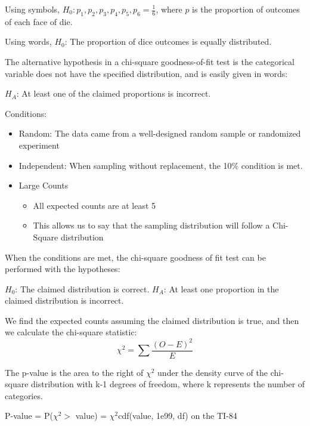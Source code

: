 \documentclass[../stats.tex]{subfiles}
\begin{document}
Using symbols, $H_0: p_1,p_2,p_3,p_4,p_5,p_6 = \frac{1}{6}$, where $p$ is the proportion of outcomes of each face of die.

Using words, $H_0$: The proportion of dice outcomes is equally distributed.

The alternative hypothesis in a chi-square goodness-of-fit test is the categorical variable does not have the specified distribution, and is easily given in words: 

$H_A$: At least one of the claimed proportions is incorrect.

Conditions:
\begin{itemize}
    \item Random: The data came from a well-designed random sample or randomized experiment 
    \item Independent: When sampling without replacement, the 10\% condition is met.
    \item Large Counts
    \begin{itemize}
        \item All expected counts are at least 5
        \item This allows us to say that the sampling distribution will follow a Chi-Square distribution 
    \end{itemize}
\end{itemize}

When the conditions are met, the chi-square goodness of fit test can be performed with the hypotheses:
\begin{center}
    $H_0$: The claimed distribution is correct.
    $H_A$: At least one proportion in the claimed distribution is incorrect.
\end{center}

We find the expected counts assuming the claimed distribution is true, and then we calculate the chi-square statistic:
\[ \chi^2 = \sum \frac{(O-E)^2}{E} \]

The p-value is the area to the right of $\chi^2$ under the density curve of the chi-square distribution with k-1 degrees of freedom, where k represents the number of categories.
\begin{center}
    P-value = P($\chi^2>$ value) = $\chi^2$cdf(value, 1e99, df) on the TI-84
\end{center}
\end{document}

